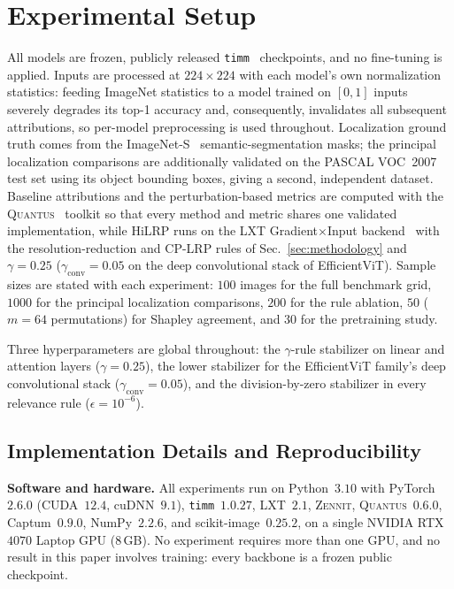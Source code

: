 \documentclass[lettersize,journal]{IEEEtran}
\theoremstyle{definition}
\theoremstyle{plain}
\begin{document}
\section{Experimental Setup}
\label{sec:setup}
All models are frozen, publicly released \texttt{timm}~\cite{wightman2019timm} checkpoints, and no fine-tuning is applied. Inputs are processed at $224{\times}224$ with each model's own normalization statistics: feeding ImageNet statistics to a model trained on $[0,1]$ inputs severely degrades its top-1 accuracy and, consequently, invalidates all subsequent attributions, so per-model preprocessing is used throughout. Localization ground truth comes from the ImageNet-S~\cite{gao2022imagenets} semantic-segmentation masks; the principal localization comparisons are additionally validated on the PASCAL VOC~2007~\cite{everingham2010voc} test set using its object bounding boxes, giving a second, independent dataset. Baseline attributions and the perturbation-based metrics are computed with the \textsc{Quantus}~\cite{hedstrom2023quantus} toolkit so that every method and metric shares one validated implementation, while HiLRP runs on the LXT Gradient$\times$Input backend~\cite{achtibat2024attnlrp} with the resolution-reduction and CP-LRP rules of Sec.~\ref{sec:methodology} and $\gamma{=}0.25$ ($\gamma_{\text{conv}}{=}0.05$ on the deep convolutional stack of EfficientViT). Sample sizes are stated with each experiment: $100$ images for the full benchmark grid, $1000$ for the principal localization comparisons, $200$ for the rule ablation, $50$ ($m{=}64$ permutations) for Shapley agreement, and $30$ for the pretraining study.

Three hyperparameters are global throughout: the $\gamma$-rule stabilizer on linear and attention layers ($\gamma{=}0.25$), the lower stabilizer for the EfficientViT family's deep convolutional stack ($\gamma_{\text{conv}}{=}0.05$), and the division-by-zero stabilizer in every relevance rule ($\epsilon{=}10^{-6}$).

\subsection{Implementation Details and Reproducibility}
\label{sec:reproducibility}

\textbf{Software and hardware.} All experiments run on Python~$3.10$ with
PyTorch~$2.6.0$ (CUDA~$12.4$, cuDNN~$9.1$), \texttt{timm}~$1.0.27$,
LXT~$2.1$, \textsc{Zennit}, \textsc{Quantus}~$0.6.0$, Captum~$0.9.0$,
NumPy~$2.2.6$, and scikit-image~$0.25.2$, on a single NVIDIA RTX~$4070$ Laptop
GPU ($8$\,GB). No experiment requires more than one GPU, and no result in this
paper involves training: every backbone is a frozen public checkpoint.
\end{document}
